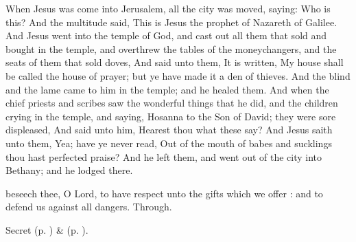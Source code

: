 
\vspace{-0.25\baselineskip}


\vspace{-0.1\baselineskip}

 When Jesus was come into Jerusalem, all the city was moved, saying: Who is this? And the multitude said, This is Jesus the prophet of Nazareth of Galilee. And Jesus went into the temple of God, and cast out all them that sold and bought in the temple, and overthrew the tables of the moneychangers, and the seats of them that sold doves, And said unto them, It is written, My house shall be called the house of prayer; but ye have made it a den of thieves. And the blind and the lame came to him in the temple; and he healed them. And when the chief priests and scribes saw the wonderful things that he did, and the children crying in the temple, and saying, Hosanna to the Son of David; they were sore displeased, And said unto him, Hearest thou what these say? And Jesus saith unto them, Yea; have ye never read, Out of the mouth of babes and sucklings thou hast perfected praise? And he left them, and went out of the city into Bethany; and he lodged there.


\vspace{-0.25\baselineskip}

\secret

\vspace{-0.1\baselineskip}

 beseech thee, O Lord, to have respect unto the gifts which we offer : and to defend us against all dangers. Through.


\begin{rubric}
     Secret  (p. \pageref{AshWednesdayMassSecret}) \&   (p. \pageref{SPLivingDeparted}).
\end{rubric}


